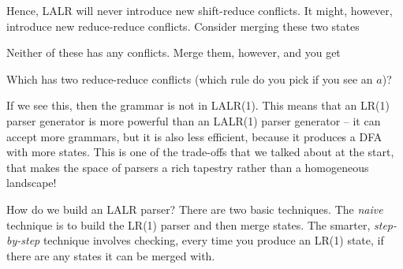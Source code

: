 Hence, LALR will never introduce new shift-reduce conflicts. It might, however, introduce new reduce-reduce conflicts. Consider merging these two states
\begin{center}
\end{center}
Neither of these has any conflicts. Merge them, however, and you get
\begin{center}
\end{center}
Which has two reduce-reduce conflicts (which rule do you pick if you see an $a$)?

If we see this, then the grammar is not in LALR(1). This means that an LR(1) parser generator is more powerful than an LALR(1) parser generator -- it can accept more grammars, but it is also less efficient, because it produces a DFA with more states. This is one of the trade-offs that we talked about at the start, that makes the space of parsers a rich tapestry rather than a homogeneous landscape!

How do we build an LALR parser? There are two basic techniques. The \textit{naive} technique is to build the LR(1) parser and then merge states. The smarter, \textit{step-by-step} technique involves checking, every time you produce an LR(1) state, if there are any states it can be merged with. 

